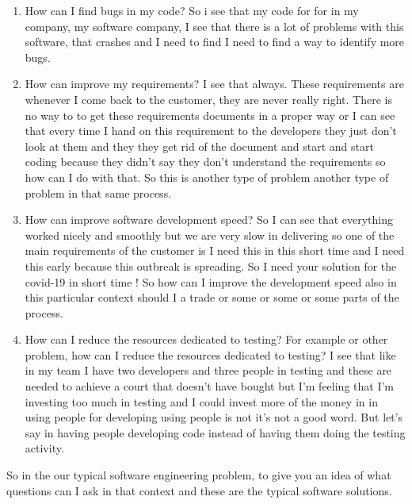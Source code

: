 \documentclass[conference, compsoc, twoside]{IEEEtran}
\begin{document}
\begin{enumerate}
	\item How can I find bugs in my code?
	So i see that my code for for in my company, my software company, I see that there is a lot of problems with this software, that crashes and I need to find I need to find a way to identify more bugs.
	\item How can improve my requirements?
	I see that always. These requirements are whenever I come back to the customer, they are never really right. 
	There is no way to to get these requirements documents in a proper way or I can see that every time I hand on this requirement to the developers they just don't look at them and they they get rid of the document and start and start coding because they didn't say they don't understand the requirements so how can I do with that. 
	So this is another type of problem another type of problem in that same process.
	\item How can improve software development speed?
	So I can see that everything worked nicely and smoothly but we are very slow in delivering so one of the main requirements of the customer is I need this in this short time and I need this early because this outbreak is spreading. 
	So I need your solution for the covid-19 in short time ! 
	So how can I improve the development speed also in this particular context should I a trade or some or some or some parts of the process.
	\item How can I reduce the resources dedicated to testing?
	For example or other problem, how can I reduce the resources dedicated to testing?
	I see that like in my team I have two developers and three people in testing and these are needed to achieve a court that doesn't have bought but I'm feeling that I'm investing too much in testing and I could invest more of the money in in using people for developing using people is not it's not a good word. 
	But let's say in having people developing code instead of having them doing the testing activity.

\end{enumerate}
So in the our typical software engineering problem, to give you an idea of what questions can I ask in that context and these are the typical software solutions. 
\end{document}
